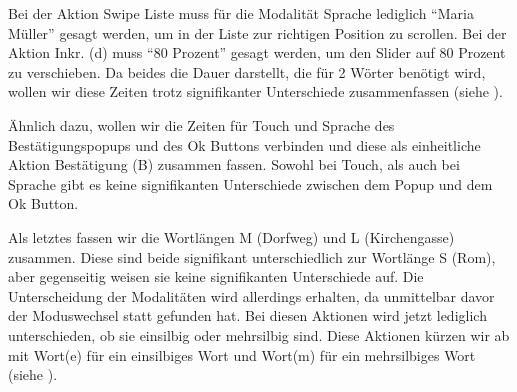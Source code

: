 Bei der Aktion Swipe Liste muss für die Modalität Sprache lediglich "`Maria Müller"' gesagt werden, um in der Liste zur richtigen Position zu scrollen. Bei der Aktion Inkr. (d) muss "`80 Prozent"' gesagt werden, um den Slider auf 80 Prozent zu verschieben. 
Da beides die Dauer darstellt, die für 2 Wörter benötigt wird, wollen wir diese Zeiten trotz signifikanter Unterschiede zusammenfassen (siehe ). 

Ähnlich dazu, wollen wir die Zeiten für Touch und Sprache des Bestätigungspopups und des Ok Buttons verbinden und diese als einheitliche Aktion Bestätigung (B) zusammen fassen. Sowohl bei Touch, als auch bei Sprache gibt es keine signifikanten Unterschiede zwischen dem Popup und dem Ok Button.

Als letztes fassen wir die Wortlängen M (Dorfweg) und L (Kirchengasse) zusammen. 
Diese sind beide signifikant unterschiedlich zur Wortlänge S (Rom), aber gegenseitig weisen sie keine signifikanten Unterschiede auf. 
Die Unterscheidung der Modalitäten wird allerdings erhalten, da unmittelbar davor der Moduswechsel statt gefunden hat. 
Bei diesen Aktionen wird jetzt lediglich unterschieden, ob sie einsilbig oder mehrsilbig sind. 
Diese Aktionen kürzen wir ab mit Wort(e) für ein einsilbiges Wort und Wort(m) für ein mehrsilbiges Wort (siehe ).

